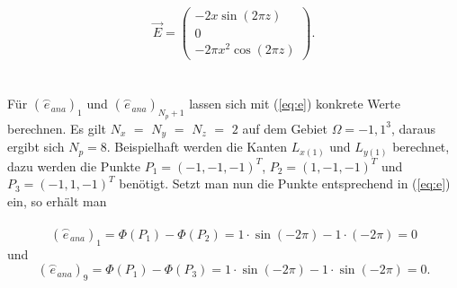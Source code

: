 \begin{equation} 
	\vec{E} = \begin{pmatrix} 
	-2x\sin(2\pi z) \\ 
	0\\ 
	-2\pi x^2\cos(2\pi z) 
	\end{pmatrix} 
	. 
\end{equation} \\ \\ 
Für $(\overset{\frown}{e}_{ana})_1$ und $(\overset{\frown}{e}_{ana})_{N_p+1}$ lassen sich mit (\ref{eq:e}) konkrete Werte berechnen. Es gilt $N_x$ $=$ $N_y$ $=$ $N_z$ $=$ $2$ auf dem Gebiet $\Omega = {-1,1}^3$, daraus ergibt sich $N_p = 8$. Beispielhaft werden die Kanten $L_{x(1)}$ und $L_{y(1)}$ berechnet, dazu werden die Punkte $P_1 = (-1,-1,-1)^T$, $P_2 = (1,-1,-1)^T$ und $P_3 = (-1,1,-1)^T$ benötigt. Setzt man nun die Punkte entsprechend in (\ref{eq:e}) ein, so erhält man \\ \\  
\begin{equation*} 
	(\overset{\frown}{e}_{ana})_1 = \Phi(P_1) - \Phi(P_2) = 1\cdot\sin(-2\pi) - 1\cdot(-2\pi) = 0 
\end{equation*} 
und  
\begin{equation*} 
(\overset{\frown}{e}_{ana})_9 = \Phi(P_1) - \Phi(P_3) = 1\cdot\sin(-2\pi) - 1\cdot\sin(-2\pi) = 0. 
\end{equation*} 
 
